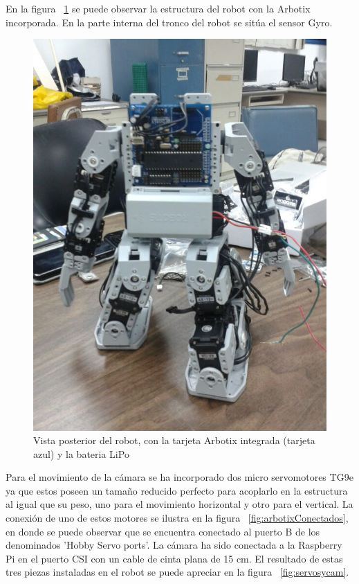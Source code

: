 En la figura ~\ref{fig:trasera2} se puede observar la estructura del robot con la Arbotix incorporada. En la parte interna del tronco del robot se sitúa el sensor Gyro.

\begin{figure}[hbtp]
\centering
\includegraphics[scale=0.2]{imagenes/traseroDeJunny.jpg}
\caption{Vista posterior del robot, con la tarjeta Arbotix integrada (tarjeta azul) y la bateria LiPo }
\label{fig:trasera2}
\end{figure}

Para el movimiento de la cámara se ha incorporado dos micro servomotores TG9e ya que estos poseen un tama\~no reducido perfecto para acoplarlo en la estructura al igual que su peso, uno para el movimiento horizontal y otro para el vertical. La conexión de uno de estos motores se ilustra en la figura ~\ref{fig:arbotixConectados}, en donde se puede observar que se encuentra conectado al puerto B de los denominados 'Hobby Servo ports'. La cámara ha sido conectada a la Raspberry Pi en el puerto \gls{CSI} con un cable de cinta plana de 15 cm. El resultado de estas tres piezas instaladas en el robot se puede apreciar en la figura ~\ref{fig:servosycam}.

